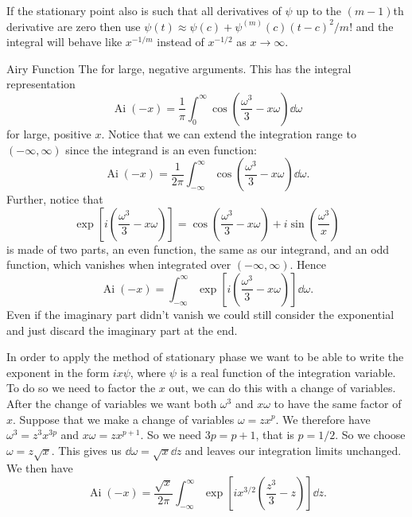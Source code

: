 \documentclass[fleqn]{NotesClass}
\DeclareMathOperator{\Ai}{Ai}
\begin{document}
    If the stationary point also is such that all derivatives of \(\psi\) up to the \((m - 1)\)th derivative are zero then use \(\psi(t) \approx \psi(c) + \psi^{(m)}(c)(t - c)^2/m!\) and the integral will behave like \(x^{-1/m}\) instead of \(x^{-1/2}\) as \(x \to \infty\).
    
    \begin{exm}{Airy Function}{}
        The \index{\(\Ai\)|see{Airy function}} for large, negative arguments.
        This has the integral representation
        \begin{equation}
            \Ai(-x) = \frac{1}{\pi} \int_0^\infty \cos\left( \frac{\omega^3}{3} - x\omega \right) \dd{\omega}
        \end{equation}
        for large, positive \(x\).
        Notice that we can extend the integration range to \((-\infty, \infty)\) since the integrand is an even function:
        \begin{equation}
            \Ai(-x) = \frac{1}{2\pi} \int_{-\infty}^{\infty} \cos\left( \frac{\omega^3}{3} - x\omega \right) \dd{\omega}.
        \end{equation}
        Further, notice that
        \begin{equation}
            \exp\left[ i\left( \frac{\omega^3}{3} - x\omega \right) \right] = \cos\left( \frac{\omega^3}{3} - x\omega \right) + i\sin\left( \frac{\omega^3}{x} \right)
        \end{equation}
        is made of two parts, an even function, the same as our integrand, and an odd function, which vanishes when integrated over \((-\infty, \infty)\).
        Hence
        \begin{equation}
            \Ai(-x) = \int_{-\infty}^{\infty} \exp\left[ i\left( \frac{\omega^3}{3} - x\omega \right) \right] \dd{\omega}.
        \end{equation}
        Even if the imaginary part didn't vanish we could still consider the exponential and just discard the imaginary part at the end.
        
        In order to apply the method of stationary phase we want to be able to write the exponent in the form \(ix\psi\), where \(\psi\) is a real function of the integration variable.
        To do so we need to factor the \(x\) out, we can do this with a change of variables.
        After the change of variables we want both \(\omega^3\) and \(x\omega\) to have the same factor of \(x\).
        Suppose that we make a change of variables \(\omega = zx^p\).
        We therefore have \(\omega^3 = z^3x^{3p}\) and \(x\omega = zx^{p+1}\).
        So we need \(3p = p + 1\), that is \(p = 1/2\).
        So we choose \(\omega = z\sqrt{x}\).
        This gives us \(\dd{\omega} = \sqrt{x}\dd{z}\) and leaves our integration limits unchanged.
        We then have
        \begin{equation}
            \Ai(-x) = \frac{\sqrt{x}}{2\pi} \int_{-\infty}^{\infty} \exp\left[ ix^{3/2}\left( \frac{z^3}{3} - z \right) \right] \dd{z}.
        \end{equation}
        

\end{exm}
\end{document}
